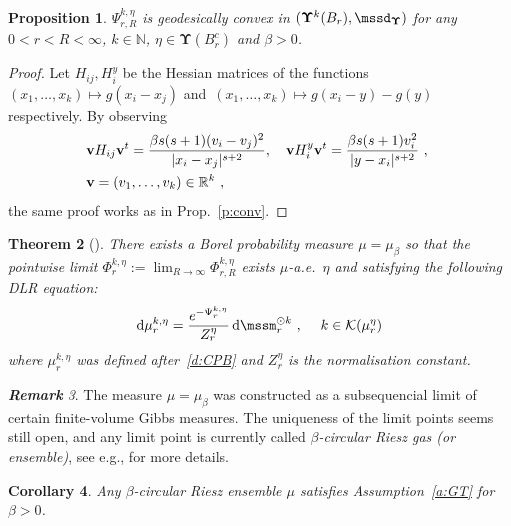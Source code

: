\documentclass[11pt,letterpaper]{amsart}
\newcommand{\diff}{\mathop{}\!\mathrm{d}}
\newcommand{\N}{{\mathbb N}}
\newcommand{\R}{{\mathbb R}}
\newcommand{\comma}{\,\,\mathrm{,}\;\,}
\newcommand{\QP}{{\mu}}
\newcommand{\dUpsilon}{{\mathbf \Upsilon}}
\newcommand{\U}{\dUpsilon}
\renewcommand{\1}{\mathbf 1}
\numberwithin{equation}{section}
\theoremstyle{plain}
\newtheorem{thm}{Theorem}[section]
\newtheorem{prop}[thm]{Proposition}%
\newtheorem{cor}[thm]{Corollary}%
\theoremstyle{definition}
\theoremstyle{remark}
\newtheorem{rem}[thm]{\bf Remark}%
\begin{document}
\begin{prop} \label{p:conv2}
$\Psi_{r, R}^{k, \eta}$ is geodesically convex in $(\U^{k}(B_r), \mssd_{\U})$ for any $0<r<R<\infty$, $k \in \N$, $\eta \in \U(B_r^c)$ and $\beta>0$.
\end{prop}
\begin{proof}
Let $H_{ij}, H_i^y$ be the Hessian matrices of the functions $(x_1, \ldots, x_k) \mapsto g(x_i-x_j)$ and~$(x_1, \ldots, x_k) \mapsto g(x_i-y)-g(y)$ respectively. 
By observing
\begin{align} \label{e:HCP}
&\mathbf v H_{ij} \mathbf v^t = \frac{\beta s(s+1)(v_i-v_j)^2}{|x_i-x_j|^{s+2}}, \quad  \mathbf v H^y_{i} \mathbf v^t = \frac{\beta s(s+1)v_i^2}{|y-x_i|^{s+2}} \comma
\\
& \mathbf v=(v_1, \ldots, v_k) \in \R^{k} \comma \notag
\end{align}
the same proof works as in Prop.~\ref{p:conv}. 
\end{proof}
\begin{thm}[{\cite[Thm.~1.8]{DerVas21}}]\label{t:BRG}
There exists a Borel probability measure $\QP=\QP_\beta$ so that the pointwise limit $\Phi_{r}^{k, \eta}:=\lim_{R\to \infty}\Phi_{r, R}^{k, \eta}$ exists $\mu$-a.e.~$\eta$ and satisfying the following DLR equation:
\begin{align} \label{d:cp2}
 \diff \mu_{r}^{k, \eta}=\frac{e^{-\Psi^{k, \eta}_{r}}}{Z_{r}^\eta} \diff \mssm_r^{\odot k}  \comma \quad k \in \mathcal K(\QP_r^\eta)
\end{align}
where $\mu_{r}^{k, \eta}$ was defined after~\eqref{d:CPB} and $Z_{r}^\eta$ is the normalisation constant. 
\end{thm}
\begin{rem}
The measure $\QP=\QP_\beta$ was constructed as a subsequencial limit of certain finite-volume Gibbs measures. The uniqueness of the limit points seems still open, and any limit point is currently called {\it $\beta$-circular Riesz gas (or ensemble)}, see e.g., \cite[Prop.~1.5]{DerVas21} for more details. 
\end{rem}
\begin{cor}
Any $\beta$-circular Riesz ensemble $\QP$ satisfies Assumption~\ref{a:GT} for $\beta>0$.
\end{cor}
\end{document}
